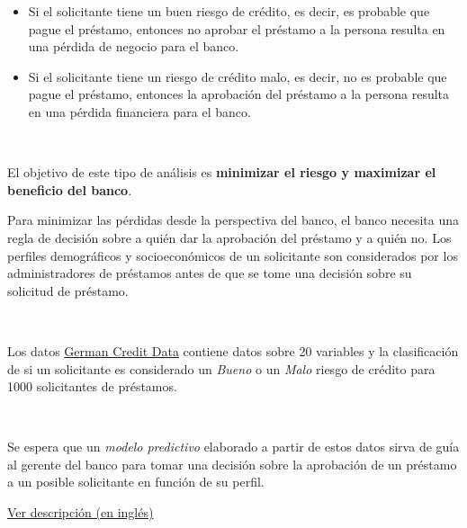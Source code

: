 \documentclass[]{book}
\begin{document}
\begin{itemize}
\item
  Si el solicitante tiene un buen riesgo de crédito, es decir, es
  probable que pague el préstamo, entonces no aprobar el préstamo a la
  persona resulta en una pérdida de negocio para el banco.
\item
  Si el solicitante tiene un riesgo de crédito malo, es decir, no es
  probable que pague el préstamo, entonces la aprobación del préstamo a
  la persona resulta en una pérdida financiera para el banco.
\end{itemize}

~

El objetivo de este tipo de análisis es \textbf{minimizar el riesgo y
maximizar el beneficio del banco}.

Para minimizar las pérdidas desde la perspectiva del banco, el banco
necesita una regla de decisión sobre a quién dar la aprobación del
préstamo y a quién no. Los perfiles demográficos y socioeconómicos de un
solicitante son considerados por los administradores de préstamos antes
de que se tome una decisión sobre su solicitud de préstamo.

~

Los datos
\href{https://archive.ics.uci.edu/ml/datasets/statlog+(german+credit+data)}{German
Credit Data} contiene datos sobre 20 variables y la clasificación de si
un solicitante es considerado un \emph{Bueno} o un \emph{Malo} riesgo de
crédito para 1000 solicitantes de préstamos.

~

Se espera que un \emph{modelo predictivo} elaborado a partir de estos
datos sirva de guía al gerente del banco para tomar una decisión sobre
la aprobación de un préstamo a un posible solicitante en función de su
perfil.

\href{ftp.ics.uci.edu/pub/machine-learning-databases/statlog/german/german.doc}{Ver
descripción (en inglés)}
\end{document}
